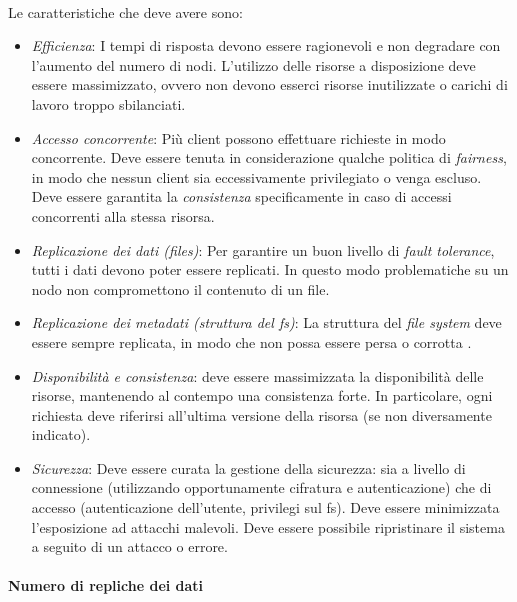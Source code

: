 \documentclass[11pt,a4paper,english]{article}
\begin{document}
\paragraph{} Le caratteristiche che deve avere sono:

\begin{itemize}
	\item \emph{Efficienza}: I tempi di risposta devono essere ragionevoli e non degradare con l'aumento del numero di nodi. L'utilizzo delle risorse a disposizione deve essere massimizzato, ovvero non devono esserci risorse inutilizzate o carichi di lavoro troppo sbilanciati.  
	
	\item \emph{Accesso concorrente}: Più client possono effettuare richieste in modo concorrente. Deve essere tenuta in considerazione qualche politica di \emph{fairness}, 
	in modo che nessun client sia eccessivamente privilegiato o venga escluso. Deve essere garantita la \emph{consistenza} specificamente in caso di accessi concorrenti alla stessa risorsa. 
	 
	\item \emph{Replicazione dei dati (files)}: Per garantire un buon livello di \emph{fault tolerance}, tutti i dati devono poter essere replicati. In questo modo problematiche su un nodo non compromettono il contenuto di un file. 
	
	\item \emph{Replicazione dei metadati (struttura del fs)}: La struttura del \emph{file system} deve essere sempre replicata, in modo che non possa essere persa o corrotta .
	
	\item \emph{Disponibilità e consistenza}: deve essere massimizzata la disponibilità delle risorse, mantenendo al contempo una consistenza forte. In particolare, ogni richiesta deve riferirsi all'ultima versione della risorsa (se non diversamente indicato).  
	
	\item \emph{Sicurezza}: Deve essere curata la gestione della sicurezza: sia a livello di connessione (utilizzando opportunamente cifratura e autenticazione) che di accesso (autenticazione dell'utente, privilegi sul fs). Deve essere minimizzata l'esposizione ad attacchi malevoli. Deve essere possibile ripristinare il sistema a seguito di un attacco o errore. 
\end{itemize} 



\paragraph{Numero di repliche dei dati}
\end{document}
